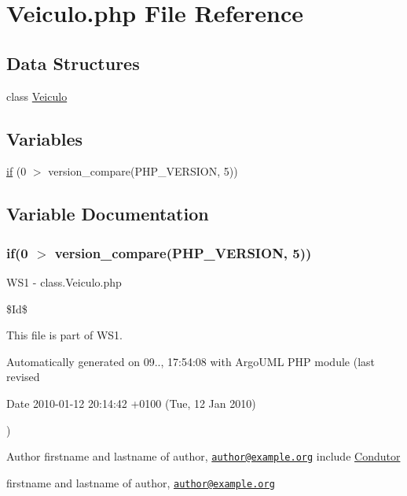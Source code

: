 \hypertarget{_veiculo_8php}{}\section{Veiculo.\+php File Reference}
\label{_veiculo_8php}
\subsection*{Data Structures}
\begin{DoxyCompactItemize}
\item 
class \hyperlink{class_veiculo}{Veiculo}
\end{DoxyCompactItemize}
\subsection*{Variables}
\begin{DoxyCompactItemize}
\item 
\hyperlink{_veiculo_8php_a88cb244e17cabaf4dee5fb3acb8168e0}{if} (0 $>$ version\+\_\+compare(P\+H\+P\+\_\+\+V\+E\+R\+S\+I\+O\+N, \textquotesingle{}5\textquotesingle{}))
\end{DoxyCompactItemize}


\subsection{Variable Documentation}
\hypertarget{_veiculo_8php_a88cb244e17cabaf4dee5fb3acb8168e0}{}
\subsubsection[{if}]{\setlength{\rightskip}{0pt plus 5cm}if(0 $>$ version\+\_\+compare(P\+H\+P\+\_\+\+V\+E\+R\+S\+I\+O\+N, \textquotesingle{}5\textquotesingle{}))}\label{_veiculo_8php_a88cb244e17cabaf4dee5fb3acb8168e0}
W\+S1 -\/ class.\+Veiculo.\+php

\$\+Id\$

This file is part of W\+S1.

Automatically generated on 09.., 17\+:54\+:08 with Argo\+U\+M\+L P\+H\+P module (last revised \begin{DoxyParagraph}{Date}
2010-\/01-\/12 20\+:14\+:42 +0100 (Tue, 12 Jan 2010) 
\end{DoxyParagraph}
)

\begin{DoxyAuthor}{Author}
firstname and lastname of author, \href{mailto:author@example.org}{\tt author@example.\+org} include \hyperlink{class_condutor}{Condutor}

firstname and lastname of author, \href{mailto:author@example.org}{\tt author@example.\+org} 
\end{DoxyAuthor}
